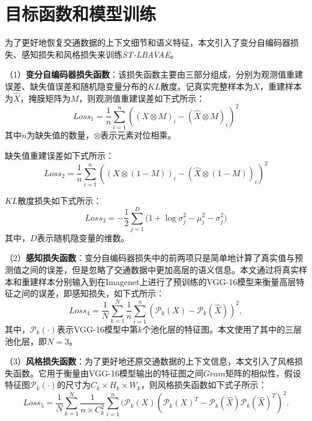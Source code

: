 \section{目标函数和模型训练} \label{sec4_5}
为了更好地恢复交通数据的上下文细节和语义特征，本文引入了变分自编码器损失、感知损失和风格损失来训练\textit{ST-LBAVAE}。

（1）\textbf{变分自编码器损失函数}：该损失函数主要由三部分组成，分别为观测值重建误差、缺失值误差和随机隐变量分布的$KL$散度。记真实完整样本为$X$，重建样本为$\hat{X}$，掩膜矩阵为$M$，则观测值重建误差如下式所示：
		\begin{equation}
			Loss_1 = \frac{1}{n}\sum_{i=1}^{n}((X \otimes M)_i - (\hat{X} \otimes M)_i)^2
		\end{equation}
		其中$n$为缺失值的数量，$\otimes$表示元素对位相乘。
		
		缺失值重建误差如下式所示：
		\begin{equation}
			Loss_2 = \frac{1}{n}\sum_{i=1}^{n}((X \otimes (1-M))_i - (\hat{X} \otimes (1-M))_i)^2
		\end{equation}
		
		$KL$散度损失如下式所示：
		\begin{equation}
			Loss_3 = -\frac{1}{2} \sum_{j=1}^{D}\bigg (1+ \log{\sigma_j^2} - \mu_j^2 - \sigma_j^2\bigg )
		\end{equation}
		其中，$D$表示随机隐变量的维数。
		
（2）\textbf{感知损失函数}：变分自编码器损失中的前两项只是简单地计算了真实值与预测值之间的误差，但是忽略了交通数据中更加高层的语义信息。本文通过将真实样本和重建样本分别输入到在Imagenet\cite{russakovsky2015imagenet}上进行了预训练的VGG-16模型\cite{simonyan2014very}来衡量高层特征之间的误差，即感知损失，如下式所示：
		\begin{equation}
			Loss_4 = \frac{1}{N} \sum_{k=1}^{N}\frac{1}{n}\sum_{i=1}^{n}(\mathcal{P}_{k}(X) - \mathcal{P}_{k}(\hat{X}))^2,
		\end{equation}
		其中，$\mathcal{P}_{k}(\cdot)$表示VGG-16模型中第$k$个池化层的特征图。本文使用了其中的三层池化层，即$N=3$。

（3）\textbf{风格损失函数}：为了更好地还原交通数据的上下文信息，本文引入了风格损失函数。它用于衡量由VGG-16模型输出的特征图之间$Gram$矩阵的相似性，假设特征图$\mathcal{P}_{k}(\cdot)$的尺寸为$C_k \times H_k \times W_k$，则风格损失函数如下式子所示：
		\begin{equation}
			Loss_5 = \frac{1}{N} \sum_{k=1}^{N} \frac{1}{n \times C_k^2}\sum_{i=1}^{n}(\mathcal{P}_{k}(X)(\mathcal{P}_{k}(X)^T - \mathcal{P}_{k}(\hat{X})\mathcal{P}_{k}(\hat{X})^T)^2.
		\end{equation}

